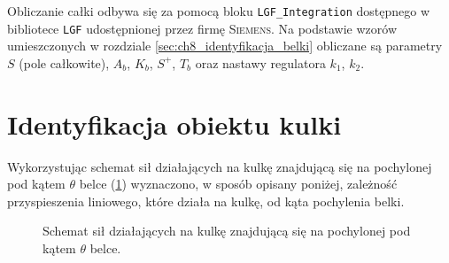 Obliczanie całki odbywa się za pomocą bloku \texttt{LGF\_Integration}\cite{LGF} dostępnego w bibliotece \texttt{LGF} udostępnionej przez firmę \textsc{Siemens}. Na podstawie wzorów umieszczonych w rozdziale \ref{sec:ch8_identyfikacja_belki} obliczane są parametry $S$ (pole całkowite), $A_b$, $K_b$, $S^+$, $T_b$ oraz nastawy regulatora $k_1$, $k_2$.

\section{Identyfikacja obiektu kulki}
\label{sec:ch8_identyfikacja_kulki}

Wykorzystując schemat sił działających na kulkę znajdującą się na pochylonej pod kątem $\theta$ belce (\cref{fig:sily_dzialajace_na_kulke}) wyznaczono, w sposób opisany poniżej, zależność przyspieszenia liniowego, które działa na kulkę, od kąta pochylenia belki.

\def\iangle{6} %
\def\arcr{1.1cm} %
\def\down{-90}

\begin{figure}[ht]
    \centering
    
    \caption{Schemat sił działających na kulkę znajdującą się na pochylonej pod kątem $\theta$ belce.}
    \label{fig:sily_dzialajace_na_kulke}
\end{figure}

